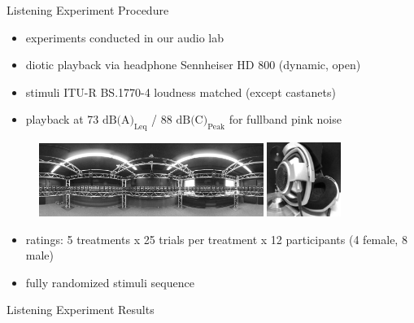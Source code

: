 \documentclass[mathserif]{intbeamer}
\begin{document}
\begin{frame}{Listening Experiment Procedure}
\begin{itemize}
\item experiments conducted in our audio lab %
\item diotic playback via \textcolor{colnonzero}{headphone} Sennheiser HD 800 (dynamic, open)
\item stimuli ITU-R BS.1770-4 loudness matched (except castanets)
\item playback at 73 $\text{dB(A)}_\text{Leq}$ / 88 $\text{dB(C)}_\text{Peak}$
for fullband pink noise
\end{itemize}
\begin{figure}
\includegraphics[width=0.65\textwidth]{graphics/URO_array_panorama_2}
\includegraphics[width=0.215\textwidth]{graphics/HD800_2}
\end{figure}
\begin{itemize}
\item ratings: 5 treatments x 25 trials per treatment x 12 participants (4 female, 8 male)
\item fully randomized stimuli sequence
\end{itemize}
\end{frame}
%
%
%
\begin{frame}{Listening Experiment Results}
\end{frame}
%
%
%
\end{document}
